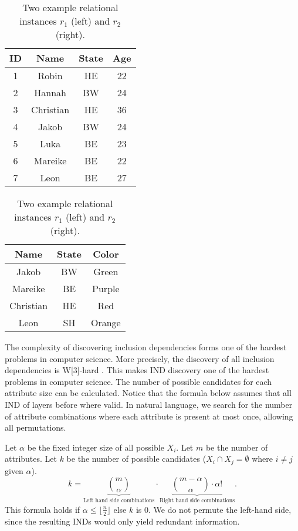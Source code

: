 \begin{table}[]
    \centering
    \begin{tabular}{c|c|c|c}
        ID & Name & State & Age \\
        \hline
        1 & Robin & HE & 22 \\
        2 & Hannah & BW & 24 \\
        3 & Christian & HE & 36 \\
        4 & Jakob & BW & 24 \\
        5 & Luka & BE & 23 \\
        6 & Mareike & BE & 22 \\
        7 & Leon & BE & 27 \\
    \end{tabular}
    \begin{tabular}{c|c|c}
        Name & State & Color \\
        \hline
        Jakob & BW & Green \\
        Mareike & BE & Purple \\
        Christian & HE & Red \\
        Leon & SH & Orange \\
    \end{tabular}
    \caption{Two example relational instances $r_1$ (left) and $r_2$ (right).}
    \label{tab:relExamp}
\end{table}

\noindent The complexity of discovering inclusion dependencies forms one of the hardest problems in computer science. More precisely, the discovery of all inclusion dependencies is W[3]-hard \cite{blasius2017parameterized}. This makes IND discovery one of the hardest problems in computer science. The number of possible candidates for each attribute size can be calculated. Notice that the formula below assumes that all IND of layers before where valid. In natural language, we search for the number of attribute combinations where each attribute is present at most once, allowing all permutations.

\begin{definition}\label{def:candidates}
    Let $\alpha$ be the fixed integer size of all possible $X_i$. Let $m$ be the number of attributes. Let $k$ be the number of possible candidates ($X_i \cap X_j = \emptyset$ where $i \not = j$ given $\alpha$).
    \[
        k = \underbrace{\binom{m}{\alpha}}_{\text{Left hand side combinations}} \cdot \underbrace{\binom{m-\alpha}{\alpha}\cdot \alpha!}_\text{Right hand side combinations}.
    \]
    This formula holds if $\alpha \leq \lfloor \frac{n}{2} \rfloor$ else $k$ is $0$. We do not permute the left-hand side, since the resulting INDs would only yield redundant information.
\end{definition}


